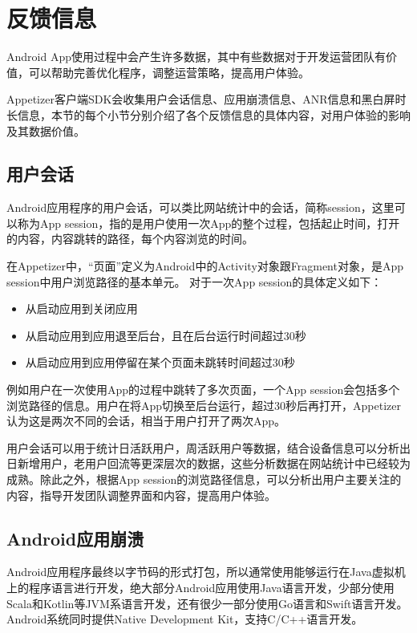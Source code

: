 \section{反馈信息}
\label{sec:replyInfo}

Android App使用过程中会产生许多数据，其中有些数据对于开发运营团队有价值，可以帮助完善优化程序，调整运营策略，提高用户体验。

Appetizer客户端SDK会收集用户会话信息、应用崩溃信息、ANR信息和黑白屏时长信息，本节的每个小节分别介绍了各个反馈信息的具体内容，对用户体验的影响及其数据价值。

\subsection{用户会话}

Android应用程序的用户会话，可以类比网站统计中的会话，简称session，这里可以称为App session，指的是用户使用一次App的整个过程，包括起止时间，打开的内容，内容跳转的路径，每个内容浏览的时间。

在Appetizer中，“页面”定义为Android中的Activity对象跟Fragment对象，是App session中用户浏览路径的基本单元。
对于一次App session的具体定义如下：

\begin{itemize}
	\item 从启动应用到关闭应用
	\item 从启动应用到应用退至后台，且在后台运行时间超过30秒
	\item 从启动应用到应用停留在某个页面未跳转时间超过30秒
\end{itemize}

例如用户在一次使用App的过程中跳转了多次页面，一个App session会包括多个浏览路径的信息。用户在将App切换至后台运行，超过30秒后再打开，Appetizer认为这是两次不同的会话，相当于用户打开了两次App。

用户会话可以用于统计日活跃用户，周活跃用户等数据，结合设备信息可以分析出日新增用户，老用户回流等更深层次的数据，这些分析数据在网站统计中已经较为成熟。除此之外，根据App session的浏览路径信息，可以分析出用户主要关注的内容，指导开发团队调整界面和内容，提高用户体验。

\subsection{Android应用崩溃}

Android应用程序最终以字节码的形式打包，所以通常使用能够运行在Java虚拟机上的程序语言进行开发，绝大部分Android应用使用Java语言开发，少部分使用Scala和Kotlin等JVM系语言开发，还有很少一部分使用Go语言和Swift语言开发。Android系统同时提供Native Development Kit，支持C/C++语言开发。

